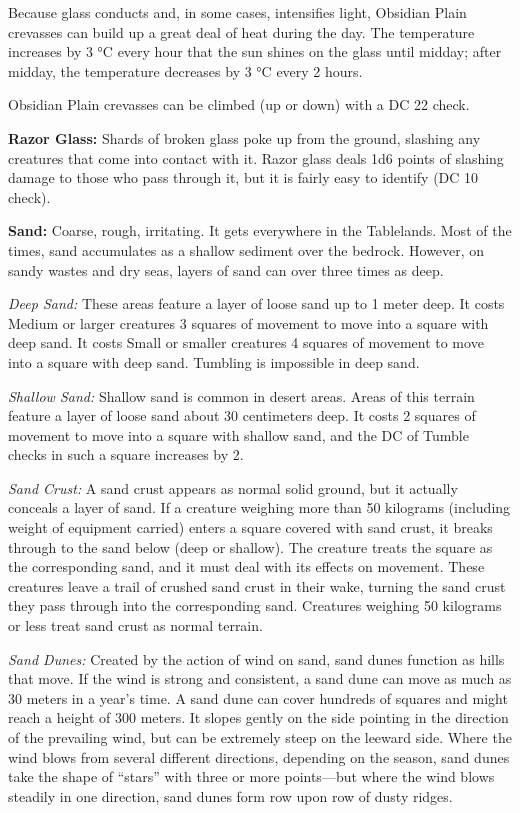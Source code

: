 Because glass conducts and, in some cases, intensifies light, Obsidian Plain crevasses can build up a great deal of heat during the day. The temperature increases by 3 °C every hour that the sun shines on the glass until midday; after midday, the temperature decreases by 3 °C every 2 hours.

Obsidian Plain crevasses can be climbed (up or down) with a DC 22  check.

\textbf{Razor Glass:} Shards of broken glass poke up from the ground, slashing any creatures that come into contact with it. Razor glass deals 1d6 points of slashing damage to those who pass through it, but it is fairly easy to identify (DC 10  check).


\textbf{Sand:} Coarse, rough, irritating. It gets everywhere in the Tablelands. Most of the times, sand accumulates as a shallow sediment over the bedrock. However, on sandy wastes and dry seas, layers of sand can over three times as deep.

\textit{Deep Sand:} These areas feature a layer of loose sand up to 1 meter deep. It costs Medium or larger creatures 3 squares of movement to move into a square with deep sand. It costs Small or smaller creatures 4 squares of movement to move into a square with deep sand. Tumbling is impossible in deep sand.

\textit{Shallow Sand:} Shallow sand is common in desert areas. Areas of this terrain feature a layer of loose sand about 30 centimeters deep. It costs 2 squares of movement to move into a square with shallow sand, and the DC of Tumble checks in such a square increases by 2.

\textit{Sand Crust:} A sand crust appears as normal solid ground, but it actually conceals a layer of sand. If a creature weighing more than 50 kilograms (including weight of equipment carried) enters a square covered with sand crust, it breaks through to the sand below (deep or shallow). The creature treats the square as the corresponding sand, and it must deal with its effects on movement. These creatures leave a trail of crushed sand crust in their wake, turning the sand crust they pass through into the corresponding sand. Creatures weighing 50 kilograms or less treat sand crust as normal terrain.

\textit{Sand Dunes:} Created by the action of wind on sand, sand dunes function as hills that move. If the wind is strong and consistent, a sand dune can move as much as 30 meters in a year's time. A sand dune can cover hundreds of squares and might reach a height of 300 meters. It slopes gently on the side pointing in the direction of the prevailing wind, but can be extremely steep on the leeward side. Where the wind blows from several different directions, depending on the season, sand dunes take the shape of ``stars'' with three or more points---but where the wind blows steadily in one direction, sand dunes form row upon row of dusty ridges.


